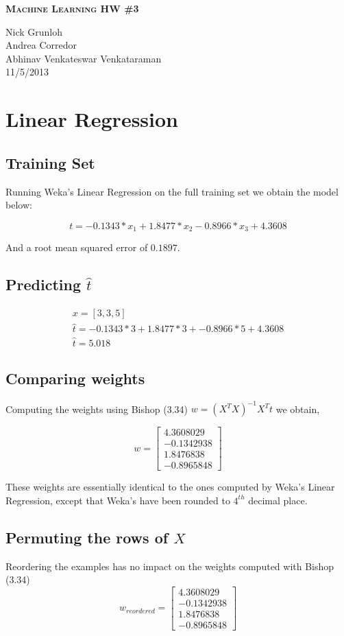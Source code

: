 \documentclass{article}
\newcommand{\header}[5]{
        \begin{minipage}[h!]{0.63\textwidth}
                \centering
                { \LARGE \textbf{ \textsc{#1} } }
        \end{minipage}
        \begin{minipage}[h!]{0.37\textwidth}
                \centering
                {#2}\\
                {#3}\\
        \end{minipage}
}
\begin{document}
\header{Machine Learning HW \#3}
       {Nick Grunloh\\Andrea Corredor\\Abhinav Venkateswar Venkataraman}
       {11/5/2013}
\\\\


\section{Linear Regression}

\subsection*{Training Set}
Running Weka's Linear Regression on the full training set we obtain the model below:

 \[ t =    -0.1343 * x_{1} +  1.8477 * x_{2}  -0.8966 * x_{3} + 4.3608 \]

\noindent And a root mean squared error of $0.1897$. 

\subsection*{Predicting $\hat{t}$}

\begin{align*}
 x = [3,3,5]  \\
 \hat{t} = -0.1343 * 3 +  1.8477 * 3 + -0.8966 * 5 + 4.3608  \\
\hat{t} = 5.018 
\end{align*}

\subsection*{Comparing weights}
Computing the weights using Bishop (3.34) $ w = (X^{T}X)^{-1}X^{T}t$  we obtain,

\[w = \begin{bmatrix}
       4.3608029  \\[0.3em]
       -0.1342938  \\[0.3em]
       1.8476838 \\[0.3em]
       -0.8965848
     \end{bmatrix} \]

These weights are essentially identical to the ones computed by Weka's Linear Regression, except that Weka's have been rounded to $4^{th}$ decimal place.

\subsection*{Permuting the rows of $X$}
Reordering the examples has no impact on the weights computed with Bishop (3.34)
\[w_{reordered} = \begin{bmatrix}
       4.3608029  \\[0.3em]
       -0.1342938  \\[0.3em]
       1.8476838 \\[0.3em]
       -0.8965848
     \end{bmatrix} \]
\end{document}
